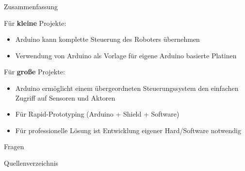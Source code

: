 \documentclass{beamer}
\begin{document}
\begin{frame}{Zusammenfassung}
\begin{large}F\"ur \textbf{kleine} Projekte:\end{large}
\begin{itemize}
	\item Arduino kann komplette Steuerung des Roboters \"ubernehmen
	\item Verwendung von Arduino als Vorlage f\"ur eigene Arduino basierte Platinen
\end{itemize}
\vspace{20px}
\begin{large}F\"ur \textbf{gro\ss{}e} Projekte:\end{large}
\begin{itemize}
	\item Arduino erm\"oglicht einem \"ubergeordneten Steuerungssystem den einfachen Zugriff auf Sensoren und Aktoren
	\item F\"ur Rapid-Prototyping (Arduino + Shield + Software)
	\item F\"ur professionelle L\"osung ist Entwicklung eigener Hard/Software notwendig
\end{itemize}
\end{frame}
\begin{frame}
	\Huge{\centerline{Fragen}}
\end{frame}
\begin{frame}[allowframebreaks]{Quellenverzeichnis}
\scriptsize{}
\end{frame}
\end{document}
